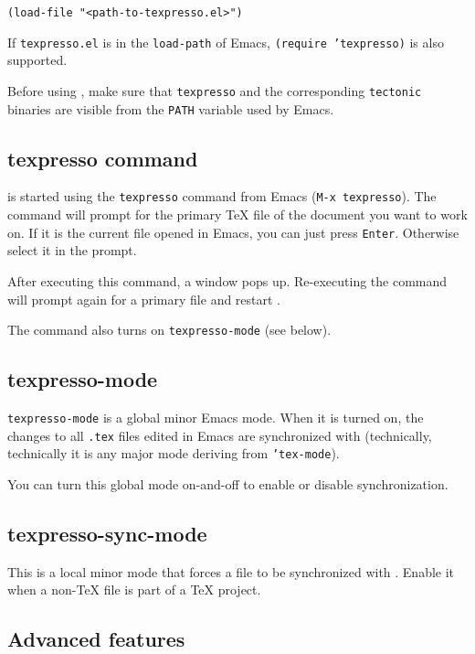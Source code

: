 \documentclass{article}
\begin{document}
\begin{verbatim}
(load-file "<path-to-texpresso.el>")
\end{verbatim}

If \texttt{texpresso.el} is in the \texttt{load-path} of Emacs, \texttt{(require 'texpresso)} is also supported.

Before using \txp, make sure that \texttt{texpresso} and the corresponding \texttt{tectonic} binaries are visible from the \texttt{PATH} variable used by Emacs.

\subsection{texpresso command}

\txp is started using the \texttt{texpresso} command from Emacs (\texttt{M-x texpresso}). The command will prompt for the primary \TeX{} file of the document you want to work on. If it is the current file opened in Emacs, you can just press \texttt{Enter}. Otherwise select it in the prompt.

After executing this command, a \txp window pops up.
Re-executing the command will prompt again for a primary file and restart \txp.

The command also turns on \texttt{texpresso-mode} (see below).

\subsection{texpresso-mode}

\texttt{texpresso-mode} is a global minor Emacs mode. When it is turned on, the changes to all \texttt{.tex} files edited in Emacs are synchronized with \txp (technically, technically it is any major mode deriving from \texttt{'tex-mode}).

You can turn this global mode on-and-off to enable or disable synchronization.

\subsection{texpresso-sync-mode}

This is a local minor mode that forces a file to be synchronized with \txp. Enable it when a non-TeX file is part of a \TeX{} project.

\subsection{Advanced features}
\end{document}
